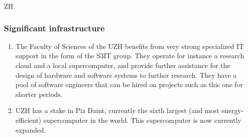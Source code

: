 \begin{sitedescription}{ZH}
\subsubsection*{Significant infrastructure}
\begin{enumerate}
\item The Faculty of Sciences of the UZH benefits from very strong specialized IT support in the form of the S3IT group. They operate for instance a research cloud and a local supercomputer,  and provide further assistance for the design of hardware and software systems to further research. They have a pool of software engineers that can be hired on projects such as this one for shorter periods.
\item UZH has a stake in Piz Daint, currently the sixth largest (and most energy-efficient) supercomputer in the world. This supercomputer is now currently expanded. 
\end{enumerate}
\end{sitedescription}


